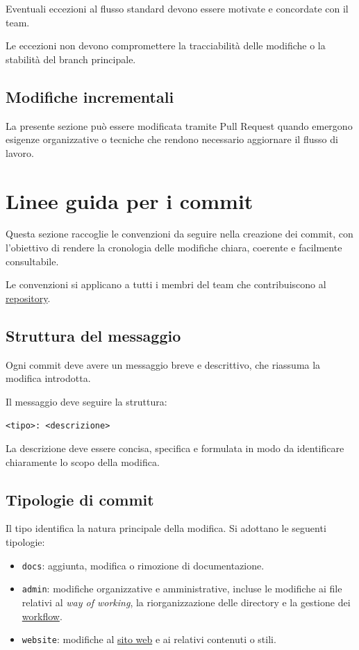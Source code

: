 \documentclass[11pt, a4paper]{article}
\begin{document}
Eventuali eccezioni al flusso standard devono essere motivate e concordate con il team.

Le eccezioni non devono compromettere la tracciabilità delle modifiche o la stabilità del branch principale.

\subsection{Modifiche incrementali}

La presente sezione può essere modificata tramite Pull Request quando emergono esigenze organizzative o tecniche che rendono necessario aggiornare il flusso di lavoro.

\section{Linee guida per i commit}
\label{sec:linee-guida-per-i-commit}

Questa sezione raccoglie le convenzioni da seguire nella creazione dei commit, con l'obiettivo di rendere la cronologia delle modifiche chiara, coerente e facilmente consultabile.

Le convenzioni si applicano a tutti i membri del team che contribuiscono al \href{https://github.com/On-By-One-Team/On-By-One.github.io}{repository}.

\subsection{Struttura del messaggio}

Ogni commit deve avere un messaggio breve e descrittivo, che riassuma la modifica introdotta.

Il messaggio deve seguire la struttura:

\noindent \texttt{<tipo>: <descrizione>}

La descrizione deve essere concisa, specifica e formulata in modo da identificare chiaramente lo scopo della modifica.

\subsection{Tipologie di commit}

Il tipo identifica la natura principale della modifica. Si adottano le seguenti tipologie:
\begin{itemize}
    \item \texttt{docs}: aggiunta, modifica o rimozione di documentazione.
    \item \texttt{admin}: modifiche organizzative e amministrative, incluse le modifiche ai file relativi al \textit{way of working}, la riorganizzazione delle directory e la gestione dei \href{https://github.com/On-By-One-Team/On-By-One.github.io/tree/main/.github/workflows}{workflow}.
    \item \texttt{website}: modifiche al \href{https://on-by-one-team.github.io/On-By-One.github.io/}{sito web} e ai relativi contenuti o stili.
\end{itemize}
\end{document}
